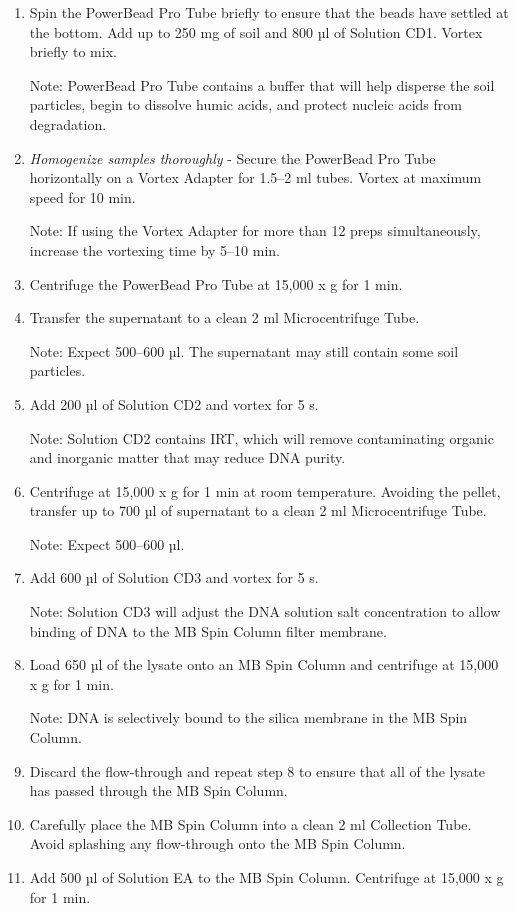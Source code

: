 \documentclass[
]{book}
\begin{document}
\begin{enumerate}
\def\labelenumi{\arabic{enumi}.}
\item
  Spin the PowerBead Pro Tube briefly to ensure that the beads have settled at the bottom. Add up to 250 mg of soil and 800 µl of Solution CD1. Vortex briefly to mix.

  Note: PowerBead Pro Tube contains a buffer that will help disperse the soil particles, begin to dissolve humic acids, and protect nucleic acids from degradation.
\item
  \emph{Homogenize samples thoroughly} - Secure the PowerBead Pro Tube horizontally on a Vortex Adapter for 1.5--2 ml tubes. Vortex at maximum speed for 10 min.

  Note: If using the Vortex Adapter for more than 12 preps simultaneously, increase the vortexing time by 5--10 min.
\item
  Centrifuge the PowerBead Pro Tube at 15,000 x g for 1 min.
\item
  Transfer the supernatant to a clean 2 ml Microcentrifuge Tube.

  Note: Expect 500--600 µl. The supernatant may still contain some soil particles.
\item
  Add 200 µl of Solution CD2 and vortex for 5 s.

  Note: Solution CD2 contains IRT, which will remove contaminating organic and inorganic matter that may reduce DNA purity.
\item
  Centrifuge at 15,000 x g for 1 min at room temperature. Avoiding the pellet, transfer up to 700 µl of supernatant to a clean 2 ml Microcentrifuge Tube.

  Note: Expect 500--600 µl.
\item
  Add 600 µl of Solution CD3 and vortex for 5 s.

  Note: Solution CD3 will adjust the DNA solution salt concentration to allow binding of DNA to the MB Spin Column filter membrane.
\item
  Load 650 µl of the lysate onto an MB Spin Column and centrifuge at 15,000 x g for 1 min.

  Note: DNA is selectively bound to the silica membrane in the MB Spin Column.
\item
  Discard the flow-through and repeat step 8 to ensure that all of the lysate has passed through the MB Spin Column.
\item
  Carefully place the MB Spin Column into a clean 2 ml Collection Tube. Avoid splashing any flow-through onto the MB Spin Column.
\item
  Add 500 µl of Solution EA to the MB Spin Column. Centrifuge at 15,000 x g for 1 min.


\end{enumerate}
\end{document}
